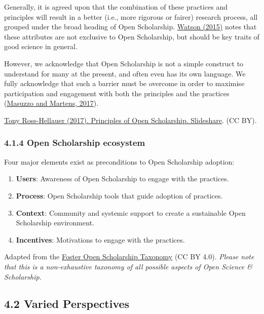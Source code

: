 Generally, it is agreed upon that the combination of these practices and
principles will result in a better (i.e., more rigorous or fairer)
research process, all grouped under the broad heading of Open
Scholarship. \href{https://doi.org/10.1186/s13059-015-0669-2}{Watson
(2015)} notes that these attributes are not exclusive to Open
Scholarship, but should be key traits of good science in general.

However, we acknowledge that Open Scholarship is not a simple construct
to understand for many at the present, and often even has its own
language. We fully acknowledge that such a barrier must be overcome in
order to maximise participation and engagement with both the principles
and the practices
(\href{https://doi.org/10.7287/peerj.preprints.2689v1}{Masuzzo and
Martens, 2017}).

\href{https://www.slideshare.net/OpenAIRE_eu/peer-review-in-the-age-of-open-science}{Tony
Ross-Hellauer (2017). Principles of Open Scholarship. Slideshare}. (CC
BY).

\subsubsection{4.1.4 Open Scholarship
ecosystem}\label{open-scholarship-ecosystem}

Four major elements exist as preconditions to Open Scholarship adoption:

\begin{enumerate}
\def\labelenumi{\arabic{enumi}.}
\item
  \textbf{Users}: Awareness of Open Scholarship to engage with the
  practices.
\item
  \textbf{Process}: Open Scholarship tools that guide adoption of
  practices.
\item
  \textbf{Context}: Community and systemic support to create a
  sustainable Open Scholarship environment.
\item
  \textbf{Incentives}: Motivations to engage with the practices.
\end{enumerate}

Adapted from the
\href{https://www.fosteropenscience.eu/taxonomy/term/102}{Foster Open
Scholarship Taxonomy} (CC BY 4.0). \emph{Please note that this is a
non-exhaustive taxonomy of all possible aspects of Open Science \&
Scholarship.}

\subsection{4.2 Varied Perspectives}\label{varied-perspectives}

